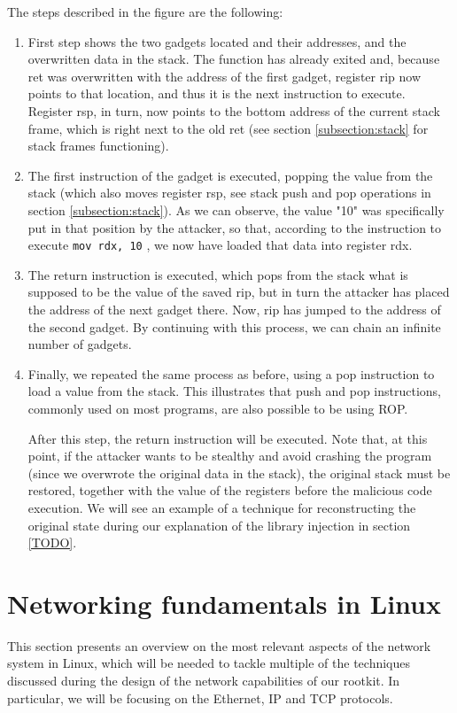 The steps described in the figure are the following:
\begin{enumerate}
\item First step shows the two gadgets located and their addresses, and the overwritten data in the stack. The function has already exited and, because ret was overwritten with the address of the first gadget, register rip now points to that location, and thus it is the next instruction to execute. Register rsp, in turn, now points to the bottom address of the current stack frame, which is right next to the old ret (see section \ref{subsection:stack} for stack frames functioning).
\item The first instruction of the gadget is executed, popping the value from the stack (which also moves register rsp, see stack push and pop operations in section \ref{subsection:stack}). As we can observe, the value "10" was specifically put in that position by the attacker, so that, according to the instruction to execute \lstinline{mov rdx, 10} \lstinline{}, we now have loaded that data into register rdx.
\item The return instruction is executed, which pops from the stack what is supposed to be the value of the saved rip, but in turn the attacker has placed the address of the next gadget there. Now, rip has jumped to the address of the second gadget. By continuing with this process, we can chain an infinite number of gadgets.
\item Finally, we repeated the same process as before, using a pop instruction to load a value from the stack. This illustrates that push and pop instructions, commonly used on most programs, are also possible to be using ROP.

After this step, the return instruction will be executed. Note that, at this point, if the attacker wants to be stealthy and avoid crashing the program (since we overwrote the original data in the stack), the original stack must be restored, together with the value of the registers before the malicious code execution. We will see an example of a technique for reconstructing the original state during our explanation of the library injection in section \ref{TODO}.
\end{enumerate}



\section{Networking fundamentals in Linux}
This section presents an overview on the most relevant aspects of the network system in Linux, which will be needed to tackle multiple of the techniques discussed during the design of the network capabilities of our rootkit. In particular, we will be focusing on the Ethernet, IP and TCP protocols.

